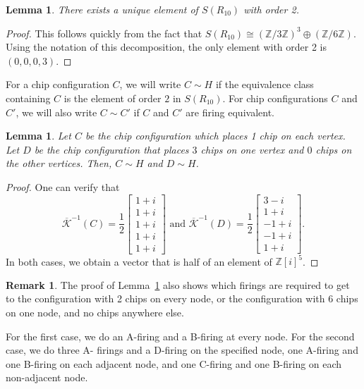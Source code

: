 \documentclass[12p]{amsart}
\numberwithin{equation}{section}
\theoremstyle{plain}
\newtheorem{lemma}[thm]{Lemma}
\theoremstyle{definition}
\newtheorem{remark}[thm]{Remark}
\newcommand{\Z}{\mathbb {Z}}
\begin{document}
\begin{lemma}
    There exists a unique element of $S(R_{10})$ with order 2. 
\end{lemma}
\begin{proof}
    This follows quickly from the fact that $S(R_{10}) \cong (\Z/3\Z)^3 \oplus (\Z/6\Z)$. Using the notation of this decomposition, the only element with order 2 is $(0,0,0,3)$.
\end{proof}

For a chip configuration $C$, we will write $C \sim H$ if the equivalence class containing $C$ is the element of order $2$ in $S(R_{10})$. For chip configurations $C$ and $C'$, we will also write $C \sim C'$ if $C$ and $C'$ are firing equivalent. 

\begin{lemma}\label{lem:half_vals} 
    Let $C$ be the chip configuration which places 1 chip on each vertex. Let $D$ be the chip configuration that places $3$ chips on one vertex and $0$ chips on the other vertices. Then, $C \sim H$ and $D \sim H$. 
\end{lemma}
\begin{proof}
    One can verify that 
    \[\overline{\mathcal K}^{-1}(C) = \frac12\begin{bmatrix}1 + i\\ 1 + i\\ 1 + i\\ 1 + i\\ 1 + i\end{bmatrix}\text{ and }\overline{\mathcal K}^{-1}(D) = \frac12\begin{bmatrix}3 -i\\ 1 + i\\ -1 + i\\ -1 + i\\ 1 + i\end{bmatrix}.\] In both cases, we obtain a vector that is half of an element of $\mathbb Z[i]^5$.  
\end{proof}

\begin{remark}\label{rem:specific}
    The proof of Lemma~\ref{lem:half_vals} also shows which firings are required to get to the configuration with 2 chips on every node, or the configuration with 6 chips on one node, and no chips anywhere else. 

    For the first case, we do an A-firing and a B-firing at every node. For the second case, we do three A- firings and a D-firing on the specified node, one A-firing and one B-firing on each adjacent node, and one C-firing and one B-firing on each non-adjacent node. 
\end{remark}
\end{document}
